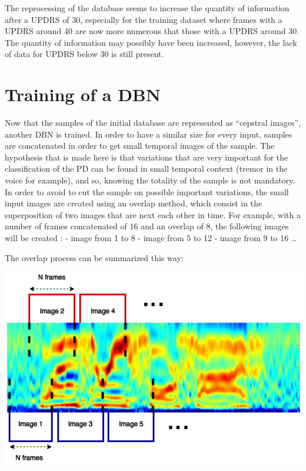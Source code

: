 \documentclass{report}
\begin{document}
	The reprocessing of the database seems to increase the quantity of information after a UPDRS of 30, especially for the training dataset where frames with a UPDRS around 40 are now more numerous that those with a UPDRS around 30. The quantity of information may possibly have been increased, however, the lack of data for UPDRS below 30 is still present.
	
	\section{Training of a DBN}
	
	Now that the samples of the initial database are represented as “cepstral images”, another DBN is trained. In order to have a similar size for every input, samples are concatenated in order to get small temporal images of the sample. The hypothesis that is made here is that variations that are very important for the classification of the PD can be found in small temporal context (tremor in the voice for example), and so, knowing the totality of the sample is not mandatory. In order to avoid to cut the sample on possible important variations, the small input images are created using an overlap method, which consist in the superposition of two images that are next each other in time. For example, with a number of frames concatenated of 16 and an overlap of 8, the following images will be created :
	- image from 1 to 8
	- image from 5 to 12
	- image from 9 to 16
	…
	
	The overlap process can be summarized this way:
	
	\vspace{0.5cm}
	\begin{center}\label{fig:cepstral}
		\includegraphics[scale=0.65]{ressources/tr1}
	\end{center}
	\vspace{0.5cm}
	
\end{document}
